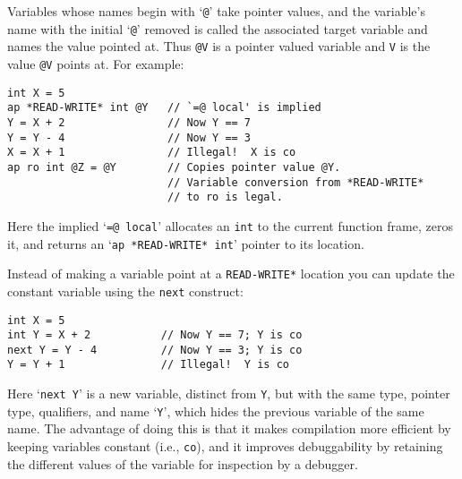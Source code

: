 \documentclass[12pt]{article}
\newenvironment{indpar}[1][0.3in]%
	{\begin{list}{}%
		     {\setlength{\itemsep}{0in}%
		      \setlength{\topsep}{0in}%
		      \setlength{\parsep}{1ex}%
		      \setlength{\labelwidth}{#1}%
		      \setlength{\leftmargin}{#1}%
		      \addtolength{\leftmargin}{\labelsep}}%
	 \item}%
	{\end{list}}
\begin{document}
Variables whose names begin with `{\tt @}' take pointer values, and
the variable's name with the
initial `{\tt @}' removed is called the associated
target variable and names the value pointed at.
Thus {\tt @V} is a pointer valued variable and {\tt V} is the value
{\tt @V} points at.
For example:

\begin{indpar}\begin{verbatim}
int X = 5
ap *READ-WRITE* int @Y   // `=@ local' is implied
Y = X + 2                // Now Y == 7
Y = Y - 4                // Now Y == 3
X = X + 1                // Illegal!  X is co
ap ro int @Z = @Y        // Copies pointer value @Y.
                         // Variable conversion from *READ-WRITE*
                         // to ro is legal.
\end{verbatim}\end{indpar}

Here the implied `{\tt =@ local}' allocates an {\tt int} to the current
function frame, zeros it, and returns an `{\tt ap *READ-WRITE* int}'
pointer to its location.

Instead of making a variable point at a {\tt *READ-WRITE*} location you
can update the constant variable using the {\tt next} construct:
\begin{indpar}\begin{verbatim}
int X = 5
int Y = X + 2           // Now Y == 7; Y is co
next Y = Y - 4          // Now Y == 3; Y is co
Y = Y + 1               // Illegal!  Y is co
\end{verbatim}\end{indpar}
Here `{\tt next Y}' is a new variable, distinct from {\tt Y},
but with the same type, pointer type, qualifiers, and name `{\tt Y}',
which hides the previous variable of the same name.
The advantage of doing this is that it makes compilation more
efficient by keeping variables constant (i.e., {\tt co}), and
it improves debuggability by retaining the different values of
the variable for inspection by a debugger.
\end{document}

